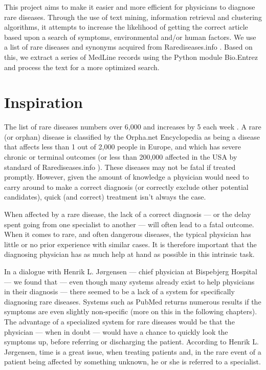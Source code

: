 This project aims to make it easier and more efficient for physicians
to diagnose rare diseases. Through the use of text mining,
information retrieval and clustering algorithms, it attempts to
increase the likelihood of getting the correct article based upon a
search of symptoms, environmental and/or human factors. We use a list
of rare diseases and synonyms acquired from Rarediseases.info
\cite{Rarediseases}. Based on this, we
extract a series of MedLine records \cite{PubMedFactSheetMedline}
using the Python module Bio.Entrez \cite{EntrezProgUtil} and process
the text for a more optimized search.

\section{Inspiration}

The list of rare diseases numbers over 6,000 and increases by 5 each
week \cite{AboutRareDiseasesOrphanet}. A rare (or orphan) disease is
classified by the Orpha.net Encyclopedia \cite{OrphanetEncyclopedia}
as being a disease that affects less than 1 out of 2,000 people in
Europe, and which has severe chronic or terminal outcomes (or less
than 200,000 affected in the USA by standard of Rarediseases.info
\cite{Rarediseases}). These diseases may not be fatal if treated
promptly. However, given the amount of knowledge a physician would
need to carry around to make a correct diagnosis (or correctly exclude
other potential candidates), quick (and correct) treatment isn't
always the case.

When affected by a rare disease, the lack of a correct diagnosis
--- or the delay spent going from one specialist to another --- will
often lead to a fatal outcome. When it comes to rare, and often
dangerous diseases, the typical physician has little or no prior
experience with similar cases. It is therefore important that the
diagnosing physician has as much help at hand as possible in this
intrinsic task.

In a dialogue with Henrik L. J\o rgensen \cite{TheDude} --- chief
physician at Bispebjerg Hospital --- we found that --- even though
many systems already exist to help physicians in their diagnosis ---
there seemed to be a lack of a system for specifically diagnosing rare
diseases. Systems such as PubMed returns numerous results if the
symptoms are even slightly non-specific (more on this in the following
chapters). The advantage of a specialized system for rare diseases
would be that the physician --- when in doubt --- would have a chance
to quickly look the symptoms up, before referring or discharging the
patient. According to Henrik L. J\o rgensen, time is a great issue,
when treating patients and, in the rare event of a patient being
affected by something unknown, he or she is referred to a specialist.

